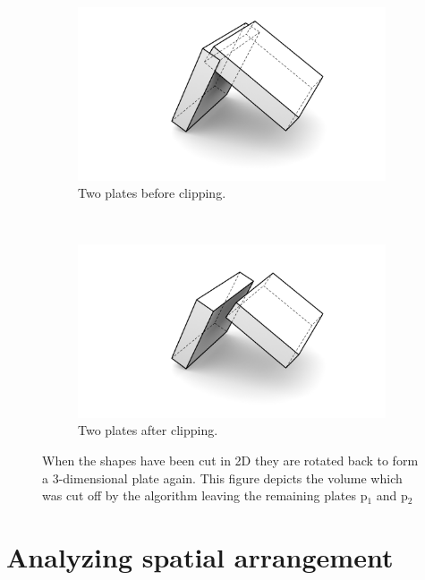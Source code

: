 \documentclass[../ClassicThesis.tex]{subfiles}
\begin{document}
\begin{figure}[ht]
    \centering
    \begin{subfigure}[b]{0.45\textwidth}
        \includegraphics[width=\columnwidth]{Images/BlocksIntersecting.png}
        \caption{Two plates before clipping.}
    \end{subfigure}
    ~
    \begin{subfigure}[b]{0.45\textwidth}
        \includegraphics[width=\columnwidth]{Images/BlocksIntersectingshortened.png}
        \caption{Two plates after clipping.}
    \end{subfigure}
    \caption{When the shapes have been cut in 2D they are rotated back to form a 3-dimensional plate again. This figure depicts the volume which was cut off by the algorithm leaving the remaining plates p$_1$ and p$_2$}
    \label{fig:3dPlaneClipping}
\end{figure}


\section{Analyzing spatial arrangement}
\end{document}
